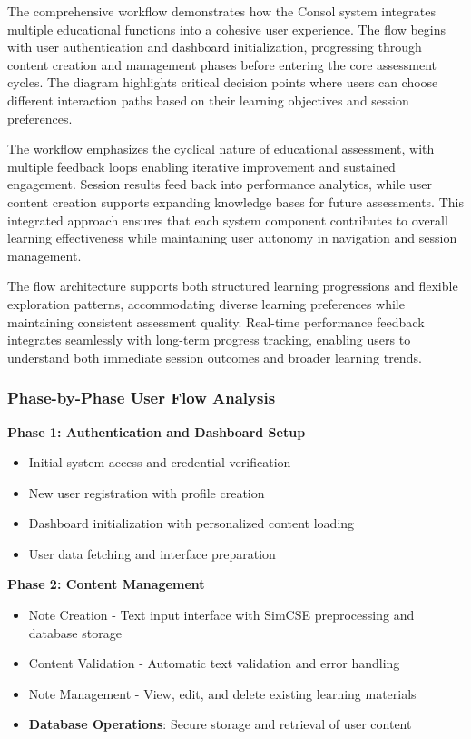 {{{The comprehensive workflow demonstrates how the Consol system integrates multiple educational functions into a cohesive user experience. The flow begins with user authentication and dashboard initialization, progressing through content creation and management phases before entering the core assessment cycles. The diagram highlights critical decision points where users can choose different interaction paths based on their learning objectives and session preferences.

The workflow emphasizes the cyclical nature of educational assessment, with multiple feedback loops enabling iterative improvement and sustained engagement. Session results feed back into performance analytics, while user content creation supports expanding knowledge bases for future assessments. This integrated approach ensures that each system component contributes to overall learning effectiveness while maintaining user autonomy in navigation and session management.

The flow architecture supports both structured learning progressions and flexible exploration patterns, accommodating diverse learning preferences while maintaining consistent assessment quality. Real-time performance feedback integrates seamlessly with long-term progress tracking, enabling users to understand both immediate session outcomes and broader learning trends.
}

\subsubsection{Phase-by-Phase User Flow Analysis}

\textbf{Phase 1: Authentication and Dashboard Setup}
\begin{itemize}
\item Initial system access and credential verification
\item New user registration with profile creation
\item Dashboard initialization with personalized content loading
\item User data fetching and interface preparation
\end{itemize}

\textbf{Phase 2: Content Management}
\begin{itemize}
\item Note Creation - Text input interface with SimCSE preprocessing and database storage
\item Content Validation - Automatic text validation and error handling
\item Note Management - View, edit, and delete existing learning materials
\item \textbf{Database Operations}: Secure storage and retrieval of user content
\end{itemize}

}}
